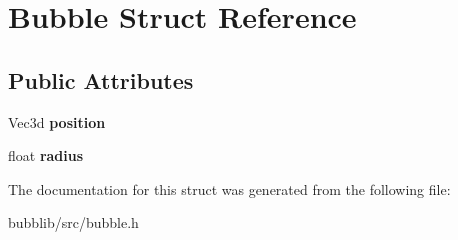 \hypertarget{struct_bubble}{}\section{Bubble Struct Reference}
\label{struct_bubble}
\subsection*{Public Attributes}
\begin{DoxyCompactItemize}
\item 
\hypertarget{struct_bubble_ac7d3ce4ac23bdd66cde72d5b6f17e013}{}Vec3d {\bfseries position}\label{struct_bubble_ac7d3ce4ac23bdd66cde72d5b6f17e013}

\item 
\hypertarget{struct_bubble_a80e7ec550065221a3e0fe8c15beb2bfe}{}float {\bfseries radius}\label{struct_bubble_a80e7ec550065221a3e0fe8c15beb2bfe}

\end{DoxyCompactItemize}


The documentation for this struct was generated from the following file\+:\begin{DoxyCompactItemize}
\item 
bubblib/src/bubble.\+h\end{DoxyCompactItemize}
